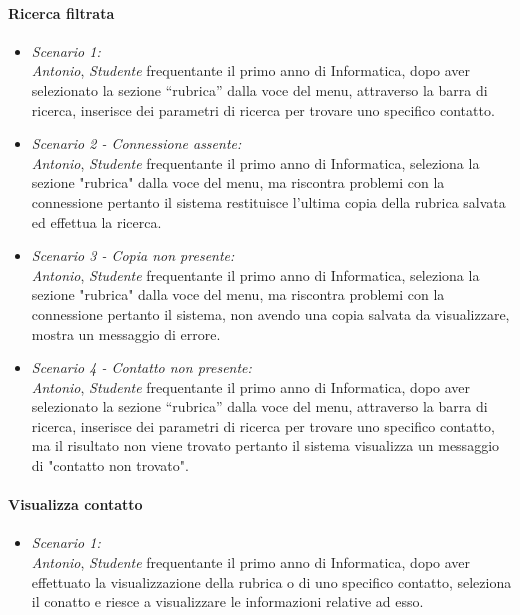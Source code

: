 \paragraph{Ricerca filtrata \\}
\begin{itemize}
	\item \textit{Scenario 1:\\}
	\textit{Antonio}, \textit{Studente} frequentante il primo anno di Informatica, dopo aver selezionato la sezione “rubrica” dalla voce del menu, attraverso la barra di ricerca, inserisce dei parametri di ricerca per trovare uno specifico contatto.\\
	
	\item \textit{Scenario 2 - Connessione assente:\\}
	\textit{Antonio}, \textit{Studente} frequentante il primo anno di Informatica, seleziona la sezione "rubrica" dalla voce del menu, ma riscontra problemi con la connessione pertanto il sistema restituisce l'ultima copia della rubrica salvata ed effettua la ricerca.\\
	
	\item \textit{Scenario 3 - Copia non presente:\\}
	\textit{Antonio}, \textit{Studente} frequentante il primo anno di Informatica, seleziona la sezione "rubrica" dalla voce del menu, ma riscontra problemi con la connessione pertanto il sistema, non avendo una copia salvata da visualizzare, mostra un messaggio di errore.\\
	
	\item \textit{Scenario 4 - Contatto non presente:\\}
	\textit{Antonio}, \textit{Studente} frequentante il primo anno di Informatica, dopo aver selezionato la sezione “rubrica” dalla voce del menu, attraverso la barra di ricerca, inserisce dei parametri di ricerca per trovare uno specifico contatto, ma il risultato non viene trovato pertanto il sistema visualizza un messaggio di "contatto non trovato".\\
\end{itemize}

\paragraph{Visualizza contatto \\}
\begin{itemize}
	\item \textit{Scenario 1:\\}
	\textit{Antonio}, \textit{Studente} frequentante il primo anno di Informatica, dopo aver effettuato la visualizzazione della rubrica o di uno specifico contatto, seleziona il conatto e riesce a visualizzare le informazioni relative ad esso.\\
\end{itemize}

